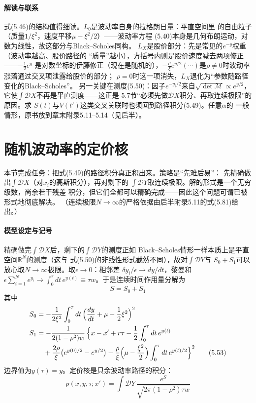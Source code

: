 \paragraph{解读与联系}
式(5.46)的结构值得细读。$L_{0}$是波动率自身的拉格朗日量：平直空间里
的自由粒子（质量$1/\xi^{2}$，速度平移$\mu-\xi^{2}/2$）——波动率方程
(5.40)本身是几何布朗运动，对数为线性，故这部分与Black--Scholes同构。
$L_{X}$是股价部分：先是常见的$e^{-y}$权重（波动率越高、股价路径的
“质量”越小），方括号内则是股价速度减去两项修正——$-\frac{1}{2}e^{y}$
是对数坐标的伊藤修正（现在是随机的），$-\frac{\rho}{\xi}e^{y/2}
(\cdots)$是$\rho\neq0$时波动率涨落通过交叉项泄露给股价的部分；
$\rho=0$时这一项消失，$L_{X}$退化为“参数随路径变化的Black--Scholes”。
另一关键在测度(5.50)：因子$e^{-y_{i}/2}$来自$\sqrt{\det\mathcal{M}}
\propto e^{y/2}$，它使$\int\mathcal{D}X$不再是平直测度——这正是
5.7节“必须先做$\mathcal{D}X$积分、再取连续极限”的原因。求
$S(t)$与$V(t')$这类交叉关联时也须回到路径积分(5.49)。任意$\alpha$的
一般情形，原书放到章末附录5.11--5.14（见后半）。

\section{随机波动率的定价核}

本节完成任务：把式(5.49)的路径积分真正积出来。策略是“先难后易”：
先精确做出$\int\mathcal{D}X$（对$x_{i}$的高斯积分），再对剩下的
$\int\mathcal{D}Y$取连续极限。解的形式是一个无穷级数，尚余若干残差
积分，但它们全都可以精确完成——因此这个问题可谓已被形式地彻底解决。
（连续极限$N\to\infty$的严格依据由后半附录5.11的式(5.81)给出。）

\paragraph{模型设定与记号}
精确做完$\int\mathcal{D}X$后，剩下的$\int\mathcal{D}Y$的测度正如
Black--Scholes情形一样本质上是平直空间$\mathbb{R}^{N}$的测度（这与
式(5.50)的非线性形式截然不同），故对$\int\mathcal{D}Y$与
$S_{0}+S_{1}$可以放心取$N\to\infty$极限。取$\epsilon\to0$：相邻差
$\delta y_{i}/\epsilon\to dy/dt$，黎曼和$\epsilon\sum_{i=1}^{N}e^{y_{i}}
\to\int_{0}^{\tau}dt\,e^{y(t)}\equiv\tau w$。于是连续时间作用量分解为
\begin{equation*}
S=S_{0}+S_{1}
\tag{5.52}
\end{equation*}
其中
\begin{align*}
S_{0}&=-\frac{1}{2\xi^{2}}\int_{0}^{\tau}dt\,
\Bigl(\frac{dy}{dt}+\mu-\frac{1}{2}\xi^{2}\Bigr)^{2}\\
S_{1}&=-\frac{1}{2(1-\rho^{2})w}\,\Bigl\{x-x'+r\tau
-\frac{1}{2}\int_{0}^{\tau}dt\,e^{y(t)}\\
&\quad+\frac{2\rho}{\xi}\bigl(e^{y(0)/2}-e^{y/2}\bigr)
-\frac{\rho}{\xi}\Bigl(\mu-\frac{\xi^{2}}{2}\Bigr)
\int_{0}^{\tau}dt\,e^{y(t)/2}\Bigr\}^{2}
\tag{5.53}
\end{align*}
边界值为$y(\tau)=y$。定价核是只余波动率路径的积分：
\begin{equation*}
p(x,y,\tau;x')=\int\mathcal{D}Y\,
\frac{e^{S}}{\sqrt{2\pi(1-\rho^{2})\tau w}}
\tag{5.54}
\end{equation*}


